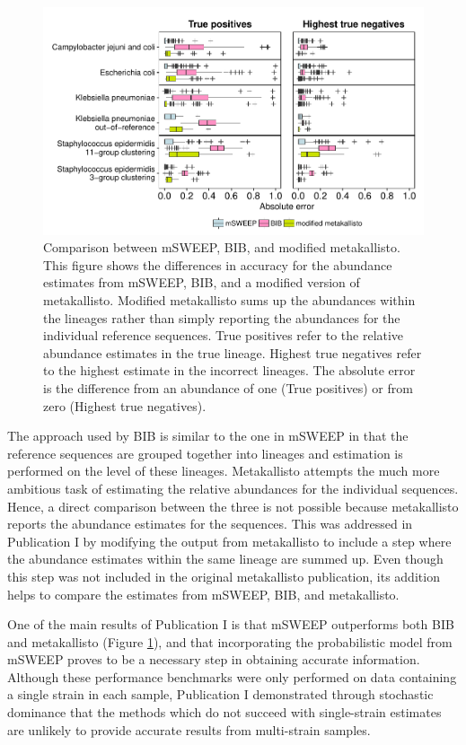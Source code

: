\documentclass[officiallayout]{tktla}
\begin{document}
\begin{figure}[!hb]
    \centering
    \includegraphics[height=0.75\textheight,width=\textwidth,keepaspectratio]{img/reproduced/WOR2021_mSWEEP_Figure_S1.pdf}
    \caption{Comparison between mSWEEP, BIB, and modified
      metakallisto. This figure shows the differences in accuracy for
      the abundance estimates from mSWEEP, BIB, and a modified version
      of metakallisto. Modified metakallisto sums up the abundances
      within the lineages rather than simply reporting the abundances
      for the individual reference sequences. True positives refer to
      the relative abundance estimates in the true lineage. Highest
      true negatives refer to the highest estimate in the incorrect
      lineages. The absolute error is the difference from an abundance
      of one (True positives) or from zero (Highest true negatives).}
  \label{fig:msweep-bib-metakallisto}
\end{figure}

The approach used by BIB is similar to the one in mSWEEP in that the
reference sequences are grouped together into lineages and estimation
is performed on the level of these lineages. Metakallisto attempts the
much more ambitious task of estimating the relative abundances for the
individual sequences. Hence, a direct comparison between the three is
not possible because metakallisto reports the abundance estimates for
the sequences. This was addressed in Publication I by modifying the
output from metakallisto to include a step where the abundance
estimates within the same lineage are summed up. Even though this step was
not included in the original metakallisto publication, its addition helps to
compare the estimates from mSWEEP, BIB, and metakallisto.

One of the main results of Publication I is that mSWEEP outperforms
both BIB and metakallisto (Figure \ref{fig:msweep-bib-metakallisto}),
and that incorporating the probabilistic model from mSWEEP proves to
be a necessary step in obtaining accurate information. Although these
performance benchmarks were only performed on data containing a single
strain in each sample, Publication I demonstrated through
stochastic dominance \citep{hadar1969rules, bawa1975optimal} that the
methods which do not succeed with single-strain estimates are unlikely
to provide accurate results from multi-strain samples.
\end{document}
